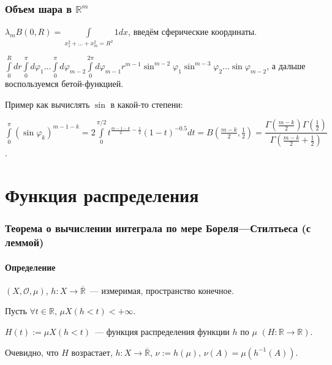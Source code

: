 \documentclass{article}
\begin{document}
    \newpage
    
    \section{Объем шара в $\mathbb R^m$}
    
        $\lambda_m B(0, R) = \int\limits_{x_1^2 + \ldots + x_m^2 = R^2} 1 dx$, введём сферические координаты.
        
        $\int\limits^R_0 dr \int\limits^{\pi}_0d\varphi_1 \ldots \int\limits^{\pi}_0 d \varphi_{m - 2} \int\limits^{2 \pi}_0 d \varphi_{m - 1} r^{m - 1} \sin^{m - 2} \varphi_1 \sin^{m - 3} \varphi_2 \ldots \sin \varphi_{m - 2}$, а дальше воспользуемся бетой-функцией.
        
        Пример как вычислять $\sin$ в какой-то степени:
        
        $\int\limits^{\pi}_0 \left(\sin \varphi_k \right)^{m - 1 - k} = 2 \int\limits^{\pi / 2}_0 t^{\frac{m - 1 - k}{2} - \frac{1}{2}} (1 - t)^{-0.5} dt = B \left( \frac{m - k}{2}, \frac{1}{2} \right) =\dfrac{\Gamma\left( \frac{m - k}{2} \right) \Gamma\left( \frac{1}{2} \right)}{\Gamma \left( \frac{m - k}{2} + \frac{1}{2} \right)}$.
   
\newpage

\part{Функция распределения}

\newpage

    \section{Теорема о вычислении интеграла по мере Бореля---Стилтьеса (с леммой)}
    
        \subsection{Определение}
        
            $\left( X, \mathcal{O}, \mu \right)$, $h : X \rightarrow \overline{\mathbb{R}}$~--- измеримая, пространство конечное.
    
            Пусть $\forall t \in \mathbb{R}$, $\mu X(h < t) < +\infty$.
    
            $H(t) := \mu X(h < t)$~--- функция распределения функции $h$ по $\mu$ $(H : \mathbb{R} \rightarrow \mathbb{R})$.
    
            Очевидно, что $H$ возрастает, $h : X \rightarrow \overline{\mathbb{R}}$, $\nu := h(\mu)$, $\nu(A) = \mu \left( h^{-1}(A) \right)$.
    
\end{document}

